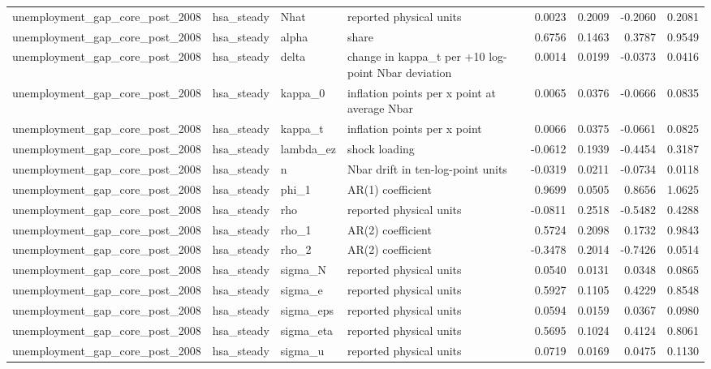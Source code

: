 \begin{tabular}{llllrrrr}
unemployment\_gap\_core\_post\_2008 & hsa\_steady & Nhat & reported physical units & 0.0023 & 0.2009 & -0.2060 & 0.2081 \\
unemployment\_gap\_core\_post\_2008 & hsa\_steady & alpha & share & 0.6756 & 0.1463 & 0.3787 & 0.9549 \\
unemployment\_gap\_core\_post\_2008 & hsa\_steady & delta & change in kappa\_t per +10 log-point Nbar deviation & 0.0014 & 0.0199 & -0.0373 & 0.0416 \\
unemployment\_gap\_core\_post\_2008 & hsa\_steady & kappa\_0 & inflation points per x point at average Nbar & 0.0065 & 0.0376 & -0.0666 & 0.0835 \\
unemployment\_gap\_core\_post\_2008 & hsa\_steady & kappa\_t & inflation points per x point & 0.0066 & 0.0375 & -0.0661 & 0.0825 \\
unemployment\_gap\_core\_post\_2008 & hsa\_steady & lambda\_ez & shock loading & -0.0612 & 0.1939 & -0.4454 & 0.3187 \\
unemployment\_gap\_core\_post\_2008 & hsa\_steady & n & Nbar drift in ten-log-point units & -0.0319 & 0.0211 & -0.0734 & 0.0118 \\
unemployment\_gap\_core\_post\_2008 & hsa\_steady & phi\_1 & AR(1) coefficient & 0.9699 & 0.0505 & 0.8656 & 1.0625 \\
unemployment\_gap\_core\_post\_2008 & hsa\_steady & rho & reported physical units & -0.0811 & 0.2518 & -0.5482 & 0.4288 \\
unemployment\_gap\_core\_post\_2008 & hsa\_steady & rho\_1 & AR(2) coefficient & 0.5724 & 0.2098 & 0.1732 & 0.9843 \\
unemployment\_gap\_core\_post\_2008 & hsa\_steady & rho\_2 & AR(2) coefficient & -0.3478 & 0.2014 & -0.7426 & 0.0514 \\
unemployment\_gap\_core\_post\_2008 & hsa\_steady & sigma\_N & reported physical units & 0.0540 & 0.0131 & 0.0348 & 0.0865 \\
unemployment\_gap\_core\_post\_2008 & hsa\_steady & sigma\_e & reported physical units & 0.5927 & 0.1105 & 0.4229 & 0.8548 \\
unemployment\_gap\_core\_post\_2008 & hsa\_steady & sigma\_eps & reported physical units & 0.0594 & 0.0159 & 0.0367 & 0.0980 \\
unemployment\_gap\_core\_post\_2008 & hsa\_steady & sigma\_eta & reported physical units & 0.5695 & 0.1024 & 0.4124 & 0.8061 \\
unemployment\_gap\_core\_post\_2008 & hsa\_steady & sigma\_u & reported physical units & 0.0719 & 0.0169 & 0.0475 & 0.1130 \\

\end{tabular}
